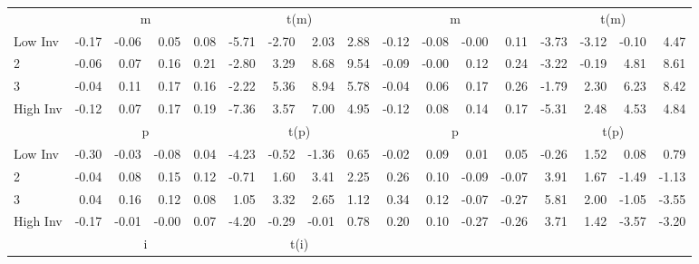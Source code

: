 \begin{table}[!ht]
\begin{tabular}{lrrrrrrrrrrrrrrrr}
  
    
      & \multicolumn{4}{c}{m} & \multicolumn{4}{c}{t(m)}
    
      & \multicolumn{4}{c}{m} & \multicolumn{4}{c}{t(m)}
    
    \\
      \cmidrule(r){2-5} \cmidrule(r){6-9} \cmidrule(r){10-13} \cmidrule(r){14-17}

    Low Inv   & -0.17  & -0.06  & 0.05  & 0.08  & -5.71  & -2.70  & 2.03  & 2.88  & -0.12  & -0.08  & -0.00  & 0.11  & -3.73  & -3.12  & -0.10  & 4.47  \\
           2  & -0.06  & 0.07  & 0.16  & 0.21  & -2.80  & 3.29  & 8.68  & 9.54  & -0.09  & -0.00  & 0.12  & 0.24  & -3.22  & -0.19  & 4.81  & 8.61  \\
           3  & -0.04  & 0.11  & 0.17  & 0.16  & -2.22  & 5.36  & 8.94  & 5.78  & -0.04  & 0.06  & 0.17  & 0.26  & -1.79  & 2.30  & 6.23  & 8.42  \\
    High Inv  & -0.12  & 0.07  & 0.17  & 0.19  & -7.36  & 3.57  & 7.00  & 4.95  & -0.12  & 0.08  & 0.14  & 0.17  & -5.31  & 2.48  & 4.53  & 4.84  \\

  
    
      & \multicolumn{4}{c}{p} & \multicolumn{4}{c}{t(p)}
    
      & \multicolumn{4}{c}{p} & \multicolumn{4}{c}{t(p)}
    
    \\
      \cmidrule(r){2-5} \cmidrule(r){6-9} \cmidrule(r){10-13} \cmidrule(r){14-17}

    Low Inv   & -0.30  & -0.03  & -0.08  & 0.04  & -4.23  & -0.52  & -1.36  & 0.65  & -0.02  & 0.09  & 0.01  & 0.05  & -0.26  & 1.52  & 0.08  & 0.79  \\
           2  & -0.04  & 0.08  & 0.15  & 0.12  & -0.71  & 1.60  & 3.41  & 2.25  & 0.26  & 0.10  & -0.09  & -0.07  & 3.91  & 1.67  & -1.49  & -1.13  \\
           3  & 0.04  & 0.16  & 0.12  & 0.08  & 1.05  & 3.32  & 2.65  & 1.12  & 0.34  & 0.12  & -0.07  & -0.27  & 5.81  & 2.00  & -1.05  & -3.55  \\
    High Inv  & -0.17  & -0.01  & -0.00  & 0.07  & -4.20  & -0.29  & -0.01  & 0.78  & 0.20  & 0.10  & -0.27  & -0.26  & 3.71  & 1.42  & -3.57  & -3.20  \\

  
    
      & \multicolumn{4}{c}{i} & \multicolumn{4}{c}{t(i)}
    

\end{tabular}
\end{table}
